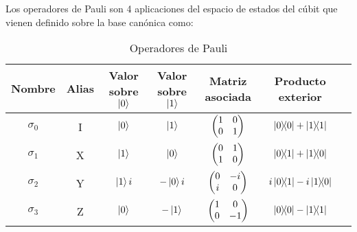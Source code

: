 Los operadores de Pauli son 4 aplicaciones del espacio de estados del cúbit que vienen definido sobre la base canónica como:
\begin{table}[htbp]
	\caption{Operadores de Pauli\label{tab:operadores-de-pauli}}
	\centering
	\begin{tabular}{ccccccc}
		\toprule
		Nombre   & Alias & Valor sobre $\ket{0}$ & Valor sobre $\ket{1}$ & Matriz asociada     & Producto exterior               \\
		\midrule
		$\sigma_0$ & I     & $\ket{0}$             & $\ket{1}$             & $\mqty({\pmat{0}})$ & $\ketbra{0}{0}+\ketbra{1}{1}$   \\
		$\sigma_1$ & X     & $\ket{1}$             & $\ket{0}$             & $\mqty({\pmat{1}})$ & $\ketbra{0}{1}+\ketbra{1}{0}$   \\
		$\sigma_2$ & Y     & $\ket{1} i$           & $-\ket{0} i$          & $\mqty({\pmat{2}})$ & $i\ketbra{0}{1}-i\ketbra{1}{0}$ \\
		$\sigma_3$ & Z     & $\ket{0}$             & $-\ket{1}$            & $\mqty({\pmat{3}})$ & $\ketbra{0}{0}-\ketbra{1}{1}$   \\
		\bottomrule
	\end{tabular}
\end{table}
